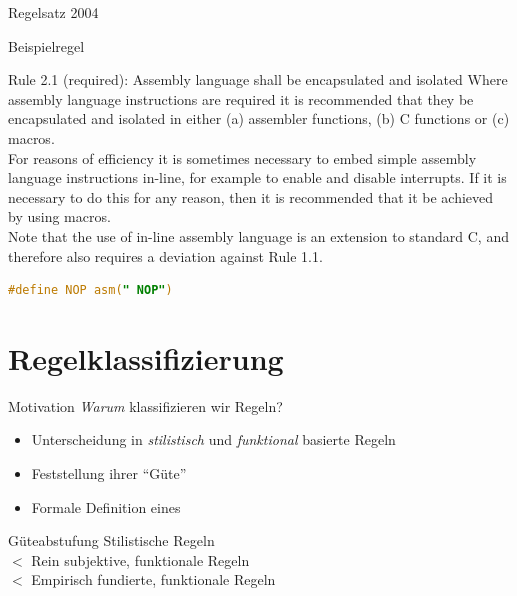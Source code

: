 \documentclass{beamer}
\begin{document}
    \begin{frame}{Regelsatz 2004}
        \begin{center}
            
        \end{center}
    \end{frame}

    \begin{frame}[fragile]{Beispielregel}
        \begin{exampleblock}{Rule 2.1 (required): Assembly language shall be encapsulated and isolated}
            Where assembly language instructions are required it is recommended that they be encapsulated
            and isolated in either (a) assembler functions, (b) C functions or (c) macros.\\
            For reasons of efficiency it is sometimes necessary to embed simple assembly language instructions
            in-line, for example to enable and disable interrupts.
            If it is necessary to do this for any reason, then it is recommended that it be achieved by using macros.\\
            Note that the use of in-line assembly language is an extension to standard C, and therefore also
            requires a deviation against Rule 1.1.
            \begin{lstlisting}[language=C]
                #define NOP asm(" NOP")
            \end{lstlisting}
        \end{exampleblock}
    \end{frame}

    \section{Regelklassifizierung}
    \label{sec:regelklassifizierung}
    \begin{frame}{Motivation}
        \textit{Warum} klassifizieren wir Regeln?
        \pause
        \begin{itemize}
            \item Unterscheidung in \textit{stilistisch} und \textit{funktional} basierte Regeln
            \item Feststellung ihrer \enquote{Güte}
            \item Formale Definition eines \slss
        \end{itemize}
        \pause
        \begin{block}{Güteabstufung}
            \quad \quad Stilistische Regeln\\
            {\boldmath $<$} \quad Rein subjektive, funktionale Regeln\\
            {\boldmath $<$} \quad Empirisch fundierte, funktionale Regeln
        \end{block}
    \end{frame}
\end{document}
